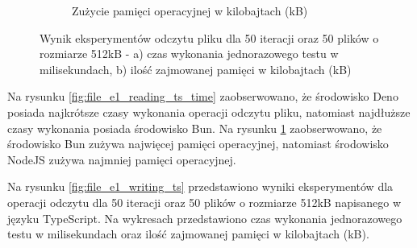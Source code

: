 \begin{figure}[H]
\begin{subfigure}[b]{0.44\textwidth}
    \caption{Zużycie pamięci operacyjnej w kilobajtach (kB)}
    \label{fig:file_e1_reading_ts_memory}
  \end{subfigure}
  \hfill
  \caption{Wynik eksperymentów odczytu pliku dla 50 iteracji oraz 50 plików o rozmiarze 512kB - a) czas wykonania jednorazowego testu w milisekundach, b) ilość zajmowanej pamięci w kilobajtach (kB)}
  \label{fig:file_e1_reading_ts}
\end{figure}

Na rysunku \ref{fig:file_e1_reading_ts_time} zaobserwowano, że środowisko Deno posiada najkrótsze czasy wykonania operacji odczytu pliku, natomiast najdłuższe czasy wykonania posiada środowisko Bun. Na rysunku \ref{fig:file_e1_reading_ts_memory} zaobserwowano, że środowisko Bun zużywa najwięcej pamięci operacyjnej, natomiast środowisko NodeJS zużywa najmniej pamięci operacyjnej.

Na rysunku \ref{fig:file_e1_writing_ts} przedstawiono wyniki eksperymentów dla operacji odczytu dla 50 iteracji oraz 50 plików o rozmiarze 512kB napisanego w języku TypeScript. Na wykresach przedstawiono czas wykonania jednorazowego testu w milisekundach oraz ilość zajmowanej pamięci w kilobajtach (kB).

